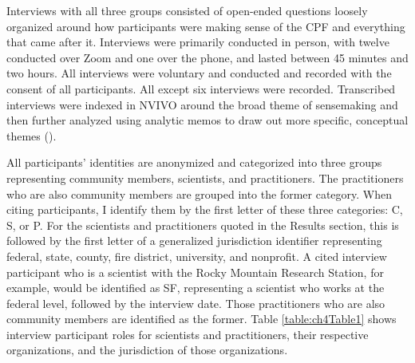 \documentclass[
]{article}
\begin{document}
Interviews with all three groups consisted of open-ended questions loosely organized around how participants were making sense of the CPF and everything that came after it. Interviews were primarily conducted in person, with twelve conducted over Zoom and one over the phone, and lasted between 45 minutes and two hours. All interviews were voluntary and conducted and recorded with the consent of all participants. All except six interviews were recorded. Transcribed interviews were indexed in NVIVO around the broad theme of sensemaking and then further analyzed using analytic memos to draw out more specific, conceptual themes ().

All participants' identities are anonymized and categorized into three groups representing community members, scientists, and practitioners. The practitioners who are also community members are grouped into the former category. When citing participants, I identify them by the first letter of these three categories: C, S, or P. For the scientists and practitioners quoted in the Results section, this is followed by the first letter of a generalized jurisdiction identifier representing federal, state, county, fire district, university, and nonprofit. A cited interview participant who is a scientist with the Rocky Mountain Research Station, for example, would be identified as SF, representing a scientist who works at the federal level, followed by the interview date. Those practitioners who are also community members are identified as the former. Table \ref{table:ch4Table1} shows interview participant roles for scientists and practitioners, their respective organizations, and the jurisdiction of those organizations.

\captionsetup{width=6.5in}
\end{document}
